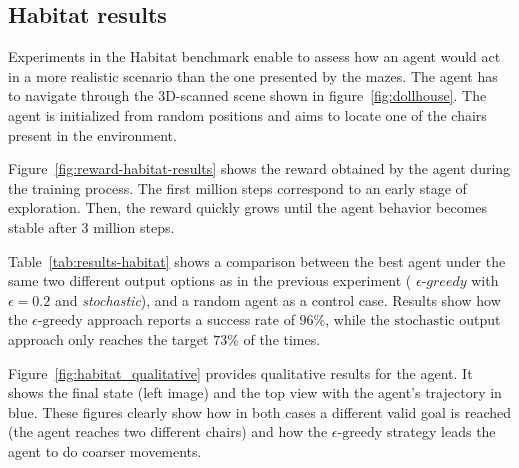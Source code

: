 \subsection{Habitat results}\label{subsec:habitat-results}
Experiments in the Habitat benchmark enable to assess how an agent would act in a more realistic scenario than the one presented by the mazes.
The agent has to navigate through the 3D-scanned scene shown in figure~\ref{fig:dollhouse}.
The agent is initialized from random positions and aims to locate one of the chairs present in the environment.

Figure~\ref{fig:reward-habitat-results} shows the reward obtained by the agent during the training process.
The first million steps correspond to an early stage of exploration.
Then, the reward quickly grows until the agent behavior becomes stable after 3 million steps.

Table~\ref{tab:results-habitat} shows a comparison between the best agent under the same two different output options as in the previous experiment ( $\epsilon\text{-}greedy$ with $\epsilon=0.2$ and \textit{stochastic}), and a random agent as a control case.
Results show how the $\epsilon\text{-greedy}$ approach reports a success rate of $96\%$, while the $\text{stochastic}$ output approach only reaches the target $73\%$ of the times.

Figure~\ref{fig:habitat_qualitative} provides qualitative results for the agent.
It shows the final state (left image) and the top view with the agent's trajectory in blue.
These figures clearly show how in both cases a different valid goal is reached (the agent reaches two different chairs) and how the $\epsilon\text{-greedy}$ strategy leads the agent to do coarser movements.


